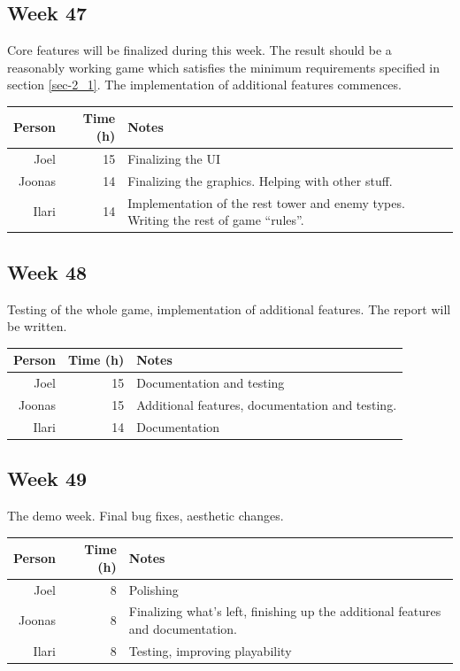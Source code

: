 \documentclass[11pt]{article}
\begin{document}
\subsection*{Week 47}

Core features will be finalized during this week. The result should be
a reasonably working game which satisfies the minimum requirements
specified in section \ref{sec-2_1}. The implementation of additional
features commences.

\begin{center}
\begin{tabular}{rrp{}}
\hline
Person  & Time (h) & Notes \\
\hline
Joel & 15 & Finalizing the UI\\
Joonas & 14 & Finalizing the graphics. Helping with other stuff.\\
Ilari & 14 & Implementation of the rest tower and enemy types. Writing the rest of game ``rules''.
\end{tabular}
\end{center}

\subsection*{Week 48}

Testing of the whole game, implementation of additional features. The
report will be written.

\begin{center}
\begin{tabular}{rrp{}}
\hline
Person  & Time (h) & Notes \\
\hline
Joel & 15 & Documentation and testing\\
Joonas & 15 & Additional features, documentation and testing.\\
Ilari & 14 & Documentation
\end{tabular}
\end{center}

\subsection*{Week 49}

The demo week. Final bug fixes, aesthetic changes.

\begin{center}
\begin{tabular}{rrp{}}
\hline
Person  & Time (h) & Notes \\
\hline
Joel & 8 & Polishing\\
Joonas & 8 & Finalizing what's left, finishing up the additional features and documentation.\\
Ilari & 8 & Testing, improving playability
\end{tabular}
\end{center}
\end{document}
